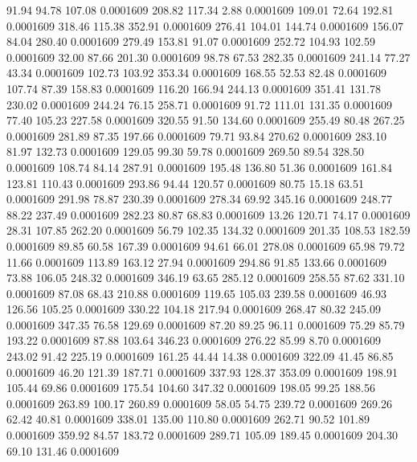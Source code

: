   91.94   94.78  107.08   0.0001609
 208.82  117.34    2.88   0.0001609
 109.01   72.64  192.81   0.0001609
 318.46  115.38  352.91   0.0001609
 276.41  104.01  144.74   0.0001609
 156.07   84.04  280.40   0.0001609
 279.49  153.81   91.07   0.0001609
 252.72  104.93  102.59   0.0001609
  32.00   87.66  201.30   0.0001609
  98.78   67.53  282.35   0.0001609
 241.14   77.27   43.34   0.0001609
 102.73  103.92  353.34   0.0001609
 168.55   52.53   82.48   0.0001609
 107.74   87.39  158.83   0.0001609
 116.20  166.94  244.13   0.0001609
 351.41  131.78  230.02   0.0001609
 244.24   76.15  258.71   0.0001609
  91.72  111.01  131.35   0.0001609
  77.40  105.23  227.58   0.0001609
 320.55   91.50  134.60   0.0001609
 255.49   80.48  267.25   0.0001609
 281.89   87.35  197.66   0.0001609
  79.71   93.84  270.62   0.0001609
 283.10   81.97  132.73   0.0001609
 129.05   99.30   59.78   0.0001609
 269.50   89.54  328.50   0.0001609
 108.74   84.14  287.91   0.0001609
 195.48  136.80   51.36   0.0001609
 161.84  123.81  110.43   0.0001609
 293.86   94.44  120.57   0.0001609
  80.75   15.18   63.51   0.0001609
 291.98   78.87  230.39   0.0001609
 278.34   69.92  345.16   0.0001609
 248.77   88.22  237.49   0.0001609
 282.23   80.87   68.83   0.0001609
  13.26  120.71   74.17   0.0001609
  28.31  107.85  262.20   0.0001609
  56.79  102.35  134.32   0.0001609
 201.35  108.53  182.59   0.0001609
  89.85   60.58  167.39   0.0001609
  94.61   66.01  278.08   0.0001609
  65.98   79.72   11.66   0.0001609
 113.89  163.12   27.94   0.0001609
 294.86   91.85  133.66   0.0001609
  73.88  106.05  248.32   0.0001609
 346.19   63.65  285.12   0.0001609
 258.55   87.62  331.10   0.0001609
  87.08   68.43  210.88   0.0001609
 119.65  105.03  239.58   0.0001609
  46.93  126.56  105.25   0.0001609
 330.22  104.18  217.94   0.0001609
 268.47   80.32  245.09   0.0001609
 347.35   76.58  129.69   0.0001609
  87.20   89.25   96.11   0.0001609
  75.29   85.79  193.22   0.0001609
  87.88  103.64  346.23   0.0001609
 276.22   85.99    8.70   0.0001609
 243.02   91.42  225.19   0.0001609
 161.25   44.44   14.38   0.0001609
 322.09   41.45   86.85   0.0001609
  46.20  121.39  187.71   0.0001609
 337.93  128.37  353.09   0.0001609
 198.91  105.44   69.86   0.0001609
 175.54  104.60  347.32   0.0001609
 198.05   99.25  188.56   0.0001609
 263.89  100.17  260.89   0.0001609
  58.05   54.75  239.72   0.0001609
 269.26   62.42   40.81   0.0001609
 338.01  135.00  110.80   0.0001609
 262.71   90.52  101.89   0.0001609
 359.92   84.57  183.72   0.0001609
 289.71  105.09  189.45   0.0001609
 204.30   69.10  131.46   0.0001609

